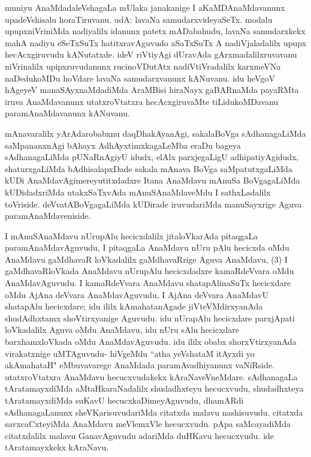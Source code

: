\begin{artha}
muniyu AnaMdadaleVshagaLa mUlaka janakanige I aKaMDAnaMdavanunx upadeVshisalu horaTiruvanu. udA: lavaNa samudarxvideyaSeTx. modalu upupxniVriniMda nadiyalilx idanunx patetx mADabahudu, lavaNa samudarxkekx mahA nadiyu eSeTxSuTx hatitxravAguvudo aSaTxSuTx A nadiVjaladalilx upupx hecAcxgiruvudu kANutatxde. ideV riVtiyAgi dUravAda gArxmadalilxruvavanu niVrinalilx upipxruvudanunx rucinoVDutAtx nadiVtiVradalilx karxmeVNa naDedukoMDu hoVdare lavaNa samudarxvanunx kANuvanu. idu heVgoV hAgeyeV manaSAyxnaMdadiMda AraMBisi hiraNayx gaBARnaMda payaRMta iruva AnaMdavanunx utatxroVtatxra hecAcxgiruvaMte tiLidukoMDavanu paramAnaMdavanunx kANuvanu. 
\end{artha}


\begin{artha}
mAnavaralilx yArAdarobabxnu daqDhakAyanAgi, sakalaBoVga sAdhanagaLiMda saMpananxnAgi bAhayx AdhAyxtimxkagaLeMba eraDu bageya sAdhanagaLiMda pUNaRnAgiyU idudx, elAlx parxjegaLigU adhipatiyAgidudx, shaturxgaLiMda bAdhisalapxDade sakala mAnava BoVga saMpatutxgaLiMda kUDi AnaMdavAgimereyutitxdadxre Itana AnaMdavu mAnuSa BoVgagaLiMda kUDidadxriMda utakxSaTxvAda mAnuSAnaMdaveMdu I sathxLadalilx toVriside. deVvatABoVgagaLiMda kUDirade iruvudariMda manuSayxrige Aguva paramAnaMdaveniside. 
\end{artha}

\begin{artha}
I mAnuSAnaMdavu nUrupAlu hecicxdalilx jitaloVkarAda pitaqgaLa paramAnaMdavAguvudu, I pitaqgaLa AnaMdavu nUru pAlu hecicxda oMdu AnaMdavu gaMdhavaR loVkadalilx gaMdhavaRrige Aguva AnaMdavu, (3) I gaMdhavaRloVkada AnaMdavu nUrupAlu hecicxdadxre kamaRdeVvara oMdu AnaMdavAguvudu. I kamaRdeVvara AnaMdavu shatapAlinaSuTx hecicxdare oMdu AjAna deVvara AnaMdavAguvudu, I AjAna deVvara AnaMdavU shatapAlu hecicxdare; idu ililx kAmahatanAgade jiVteVMdirxyanAda shudAdhxtamx shoVtirxyanige Aguvudu. idu nUrapAlu hecicxdare parxjApati loVkadalilx Aguva oMdu AnaMdavu, idu nUru sAlu hecicxdare barxhamxloVkada oMdu AnaMdavAguvudu. idu ililx obabx shorxVtirxyanAda virakatxnige uMTAguvudu- hiVgeMdu ``atha yeVshataM itAyxdi yo akAmahataH" eMbuvavarege AnaMdada paramAvadhiyanunx vaNiRside. utatxroVtatxra AnaMdavu hecucxvudakekx kAraNaveVneMdare. sAdhanagaLa tAratamayxdiMda aMtaHkaraNadalilx shudadhxteyu hecucxvudu, shudadhxteya tAratamayxdiMda suKavU hecucxkaDimeyAguvudu, dhamARdi sAdhanagaLanunx sheVKarisuvudariMda citatxda malavu nashisuvudu. citatxda savxcaCxteyiMda AnaMdavu meVlemxVle hecucxvudu. pApa saMcayadiMda citatxdalilx malavu GanavAguvudu adariMda duHKavu hecucxvudu. ide tAratamayxkekx kAraNavu. 
\end{artha}%

